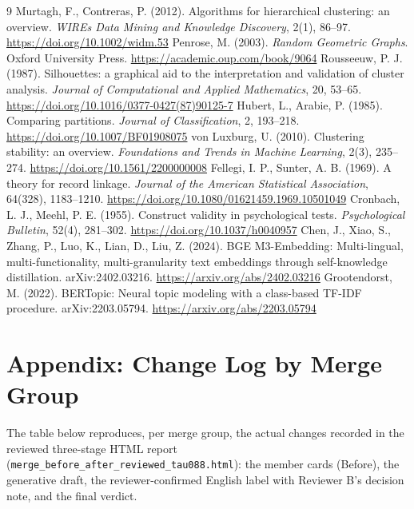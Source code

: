 \documentclass[11pt,a4paper]{article}
\begin{document}
\begin{thebibliography}{9}
 Murtagh, F., Contreras, P. (2012). Algorithms for hierarchical clustering: an overview. \emph{WIREs Data Mining and Knowledge Discovery}, 2(1), 86--97. \url{https://doi.org/10.1002/widm.53}
 Penrose, M. (2003). \emph{Random Geometric Graphs}. Oxford University Press. \url{https://academic.oup.com/book/9064}
 Rousseeuw, P. J. (1987). Silhouettes: a graphical aid to the interpretation and validation of cluster analysis. \emph{Journal of Computational and Applied Mathematics}, 20, 53--65. \url{https://doi.org/10.1016/0377-0427(87)90125-7}
 Hubert, L., Arabie, P. (1985). Comparing partitions. \emph{Journal of Classification}, 2, 193--218. \url{https://doi.org/10.1007/BF01908075}
 von Luxburg, U. (2010). Clustering stability: an overview. \emph{Foundations and Trends in Machine Learning}, 2(3), 235--274. \url{https://doi.org/10.1561/2200000008}
 Fellegi, I. P., Sunter, A. B. (1969). A theory for record linkage. \emph{Journal of the American Statistical Association}, 64(328), 1183--1210. \url{https://doi.org/10.1080/01621459.1969.10501049}
 Cronbach, L. J., Meehl, P. E. (1955). Construct validity in psychological tests. \emph{Psychological Bulletin}, 52(4), 281--302. \url{https://doi.org/10.1037/h0040957}
 Chen, J., Xiao, S., Zhang, P., Luo, K., Lian, D., Liu, Z. (2024). BGE M3-Embedding: Multi-lingual, multi-functionality, multi-granularity text embeddings through self-knowledge distillation. arXiv:2402.03216. \url{https://arxiv.org/abs/2402.03216}
 Grootendorst, M. (2022). BERTopic: Neural topic modeling with a class-based TF-IDF procedure. arXiv:2203.05794. \url{https://arxiv.org/abs/2203.05794}
\end{thebibliography}

\appendix
\section{Appendix: Change Log by Merge Group}

The table below reproduces, per merge group, the actual changes recorded in the reviewed three-stage HTML report (\texttt{merge\_before\_after\_reviewed\_tau088.html}): the member cards (Before), the generative draft, the reviewer-confirmed English label with Reviewer B's decision note, and the final verdict.


\end{document}
